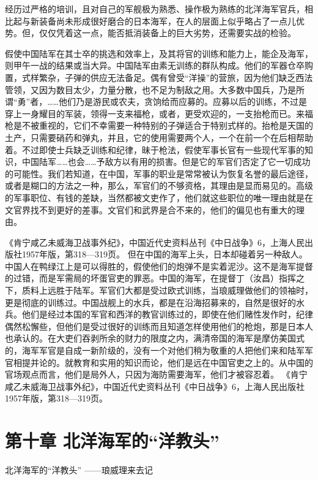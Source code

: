 \documentclass[12pt,UTF8]{ctexbook}
\begin{document}
经历过严格的培训，且对自己的军舰极为熟悉、操作极为熟练的北洋海军官兵，相比起与新装备尚未形成很好磨合的日本海军，在人的层面上似乎略占了一点儿优势。但，仅仅凭着这一点，能否抵消装备上的巨大劣势，还需要实战的检验。

假使中国陆军在其士卒的挑选和效率上，及其将官的训练和能力上，能企及海军，则甲午一战的结果或当大异。中国陆军由素无训练的群队构成。他们的军器仓卒购置，式样繁杂，子弹的供应无法备足。偶有曾受“洋操”的营旅，因为他们缺乏西法管领，又因为数目太少，力量分散，也不足为制敌之用。大多数中国兵，乃是所谓“勇”者，……他们乃是游民或农夫，贪饷给而应募的。应募以后的训练，不过是穿上一身耀目的军装，领得一支来福枪，或者，更受欢迎的，一支抬枪而已。来福枪是不被重视的，它们不幸需要一种特别的子弹适合于特别式样的。抬枪是天国的土产，只需要硝药和弹丸，并且，它的使用需要两个人，一个在前一个在后相帮助着。不过即使士兵缺乏训练和纪律，昧于枪法，假使军事长官有一些现代军事的知识，中国陆军……也会……予敌方以有用的损害。但是它的军官们否定了它一切成功的可能性。我们若知道，在中国，军事的职业是常常被认为恢复名誉的最后途径，或者是糊口的方法之一种，那么，军官们的不够资格，其理由是显而易见的。高级的军事职位、有钱的差缺，当然都被文吏作了，他们就这些职位的唯一理由就是在文官界找不到更好的差事。文官们和武界是合不来的，他们的偏见也有重大的理由。

《肯宁咸乙未威海卫战事外纪》，中国近代史资料丛刊《中日战争》6，上海人民出版社1957年版，第318—319页。
但在中国的海军上头，日本却碰着另一种敌人。中国人在鸭绿江上是可以得胜的，假使他们的炮弹不是实着泥沙。这不是海军提督的过错，而是军需局的坏蛋官吏的罪恶。中国的海军，在提督丁（汝昌）指挥之下，质料上远胜于陆军。军官们大都是受过欧式训练，当琅威理做他们的领袖时，更是彻底的训练过。中国战舰上的水兵，都是在沿海招募来的，自然是很好的水兵。他们是经过本国的军官和西洋的教官训练过的，即使在他们赌性发作时，纪律偶然松懈些，但他们是受过很好的训练而且知道怎样使用他们的枪炮，那是日本人也承认的。在大吏们吞剥所余的财力的限度之内，满清帝国的海军是摩仿美国式的，海军军官是自成一新阶级的，没有一个对他们稍为敬重的人把他们来和陆军军官相提并论的。就教育和实用的知识而论，他们是远在中国官吏之上的。从中国的官场观点而言，他们是局外人，只因为海防需要海军，他们才被容忍着。 《肯宁咸乙未威海卫战事外纪》，中国近代史资料丛刊《中日战争》6，上海人民出版社1957年版，第318—319页。

\chapter{第十章 北洋海军的“洋教头”}

北洋海军的“洋教头”
——琅威理来去记
\end{document}
